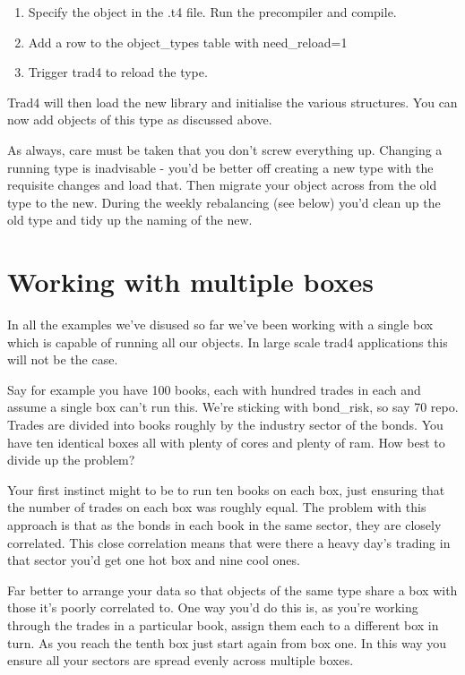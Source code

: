 \documentclass{report}
\begin{document}
\begin{enumerate}
\item Specify the object in the .t4 file. Run the precompiler and compile.
\item Add a row to the object_types table with need_reload=1
\item Trigger trad4 to reload the type.
\end{enumerate}

Trad4 will then load the new library and initialise the various structures. You can now add objects of this type as discussed above.

As always, care must be taken that you don't screw everything up. Changing a running type is inadvisable - you'd be better off creating a new type with the requisite changes and load that. Then migrate your object across from the old type to the new. During the weekly rebalancing (see below) you'd clean up the old type and tidy up the naming of the new.

\section{Working with multiple boxes}

In all the examples we've disused so far we've been working with a single box which is capable of running  all our objects. In large scale trad4 applications this will not be the case.

Say for example you have 100 books, each with hundred trades in each and assume a single box can't run this. We're sticking with bond_risk, so say 70%
repo. Trades are divided into books roughly by the industry sector of the bonds. You have ten identical boxes all with plenty of cores and plenty of ram. How best to divide up the problem?

Your first instinct might to be to run ten books on each box, just ensuring that the number of trades on each box was roughly equal. The problem with this approach is that as the bonds in each book in the same sector, they are closely correlated. This close correlation means that were there a heavy day's trading in that sector you'd get one hot box and nine cool ones.

Far better to arrange your data so that objects of the same type share a box with those it's poorly correlated to. One way you'd do this is, as you're working through the trades in a particular book, assign them each to a different box in turn. As you reach the tenth box just start again from box one. In this way you ensure all your sectors are spread evenly across multiple boxes.
\end{document}
